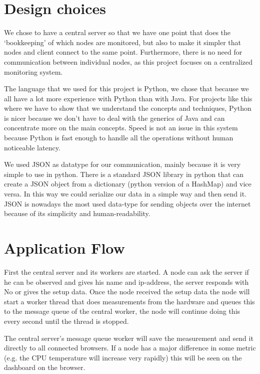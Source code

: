 \documentclass{article}
\begin{document}
\section{Design choices}
	We chose to have a central server so that we have one point that 
	does the `bookkeeping' of which nodes are monitored, but also to 
	make it simpler that nodes and client connect to the same point. 
	Furthermore, there is no need for communication between individual nodes, 
	as this project focuses on a centralized monitoring system. 
	
	The language that we used for this project is Python, we chose that 
	because we all have a lot more experience with Python than with Java. For 
	projects like this where we have to show that we understand the concepts 
	and techniques, Python is nicer because we don't have to deal with the
	generics of Java and can concentrate more on the main concepts. Speed is 
	not an issue in this system because Python is fast enough to handle all 
	the operations without human noticeable latency.
	
	We used JSON as datatype for our communication, mainly because it is very 
	simple to use in python. There is a standard JSON library in python 
	that can create a JSON object from a dictionary (python version of a 
	HashMap) and vice versa.
	In this way we could serialize our data in a simple way and then send it.
	JSON is nowadays the most used data-type for sending objects over the 
	internet because of its simplicity and human-readability. %
	
\section{Application Flow}
	First the central server and its workers are started. A node can ask the 
	server if he can be observed and gives his name and ip-address, the server 
	responds with No or gives the setup data. Once the node received the setup 
	data the node will start a worker thread that does measurements from the 
	hardware and queues this to the message queue of the central worker, the 
	node will continue doing this every second until the thread is stopped. 

	The central server's message queue worker will save the measurement and 
	send it directly to all connected browsers. If a node has a major difference
	in some metric (e.g. the CPU temperature will increase very rapidly) this 
	will be seen on the dashboard on the browser. 
\end{document}
